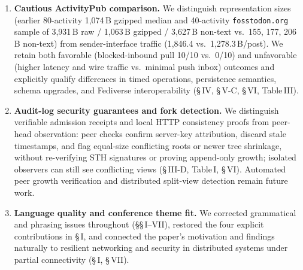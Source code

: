 \documentclass[10pt,a4paper]{article}
\begin{document}
\begin{enumerate}
  \item \textbf{Cautious ActivityPub comparison.}
  We distinguish representation sizes (earlier 80-activity 1,074\,B gzipped median and 40-activity \texttt{fosstodon.org} sample of 3,931\,B raw / 1,063\,B gzipped / 3,627\,B non-text vs.\ 155, 177, 206\,B non-text) from sender-interface traffic (1,846.4 vs.\ 1,278.3\,B/post). We retain both favorable (blocked-inbound pull 10/10 vs.\ 0/10) and unfavorable (higher latency and wire traffic vs.\ minimal push inbox) outcomes and explicitly qualify differences in timed operations, persistence semantics, schema upgrades, and Fediverse interoperability (\S\,IV, \S\,V-C, \S\,VI, Table\,III).

  \item \textbf{Audit-log security guarantees and fork detection.}
  We distinguish verifiable admission receipts and local HTTP consistency proofs from peer-head observation: peer checks confirm server-key attribution, discard stale timestamps, and flag equal-size conflicting roots or newer tree shrinkage, without re-verifying STH signatures or proving append-only growth; isolated observers can still see conflicting views (\S\,III-D, Table\,I, \S\,VI). Automated peer growth verification and distributed split-view detection remain future work.

  \item \textbf{Language quality and conference theme fit.}
  We corrected grammatical and phrasing issues throughout (\S\S\,I--VII), restored the four explicit contributions in \S\,I, and connected the paper's motivation and findings naturally to resilient networking and security in distributed systems under partial connectivity (\S\,I, \S\,VII).
\end{enumerate}
\end{document}
